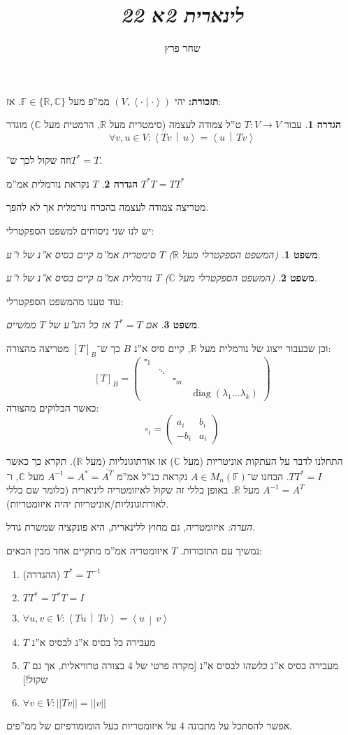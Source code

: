 \documentclass[]{article}
\author{שחר פרץ}
\title{\textit{לינארית 2א 22}}
\newcommand\R     {\mathbb{R}}
\newcommand\C     {\mathbb{C}}
\newcommand\ra    {\rangle}
\newcommand\la    {\langle}
\newcommand\ol    {\overline}
\DeclareMathOperator{\diag}    {diag}
\newcommand\F         {\mathbb{F}}
\newcommand\co        {\colon}
\newcommand\pms[1]    {\begin{pmatrix}
		#1
\end{pmatrix}}
\newcommand\norm[1]   {\left \vert \left \vert #1 \right \vert \right \vert}
\newcommand\smut      {\left \la \cdot \mid \cdot \right \ra}
\newcommand\mut[2]    {\left \la #1 \,\middle\vert\, #2 \right \ra}
\renewcommand\lg      {\lambda}
\newcommand\op    {^{-1}}
\newtheorem{Theorem}{משפט}
\theoremstyle{definition}
\newtheorem{definition}{הגדרה}
\newcommand\theo  [1] {\begin{Theorem}#1\end{Theorem}}
\newcommand\defi  [1] {\begin{definition}#1\end{definition}}
\begin{document}
	\maketitle
	\textbf{תזכורת: }יהי $(V, \smut)$ ממ''פ מעל $\F \in \{\R, \C\}$. אז: 
	\defi{עבור $T \co V \to V$ ט''ל צמודה לעצמה (סימטרית מעל $\R$, הרמטית מעל $\C$) מוגדר
	\[ \forall v, u \in V \co \mut{Tv}{u} = \mut{u}{Tv} \]}
	וזה שקול לכך ש־$T^* = T$. 
	\defi{$T$ נקראת נורמלית אמ''מ $T^*T = TT^*$}
	
	מטריצה צמודה לעצמה בהכרח נורמלית אך לא להפך. 
	
	יש לנו שני ניסוחים למשפט הספקטרלי: 
	
	\theo{(המשפט הספקטרלי מעל $\R$) $T$ סימטרית אמ''מ קיים בסיס א''נ של ו''ע. }
	\theo{(המשפט הספקטרלי מעל $\C$) $T$ נורמלית אמ''מ קיים בסיס א''נ של ו''ע. }
	
	\dotfill
	
	עוד טענו מהמשפט הספקטרלי: 
	
	\theo{אם $T^* = T$ אז כל הע''ע של $T$ ממשיים. }
	וכן שבעבור ייצוג של נורמלית מעל $\R$, קיים סיס א''נ $B$ כך ש־$[T]_B$ מטריצה מהצורה: 
	\[ [T]_B = \pms{\square_1 \\ & \ddots \\ &&\square_m \\ &&& \diag(\lg_1 \dots \lg_k)} \]
	כאשר הבלוקים מהצורה: 
	\[ \square_i = \pms{a_i & b_i \\ -b_i & a_i} \]
	
	\dotfill
	
	התחלנו לדבר על העתקות אוניטריות (מעל $\C$) או אורתוגונליות (מעל $\R$). תקרא כך כאשר $TT^* = I$. הבחנו ש־$A \in M_n(\F)$ נקראת כנ''ל אמ''מ $A\op = A^* = \ol{A^T}$ מעל $\C$, ו־$A\op = A^T$ מעל $\R$. באופן כללי זה שקול לאיזומטריה ליניארית (כלומר שם כללי לאורתוגונליות/אוניטריות יהיה איזומטריות). 
	
	\textit{הערה: }איזומטריה, גם מחוץ ללינארית, היא פונקציה שמשרת גודל. 
	
	נמשיך עם התזכורות. $T$ איזומטריה אמ''מ מתקיים אחד מבין הבאים: 
	\begin{enumerate}
		\item (ההגדרה) \hfil $T^* = T\op$
		\item \hfil $TT^* = T^*T = I$
		\item \hfil $\forall u, v \in V \co \mut{Tu}{Tv} = \mut{u}{v}$
		\item $T$ מעבירה כל בסיס א''נ לבסיס א''נ
		\item $T$ מעבירה בסיס א''נ \textit{כלשהו} לבסיס א''נ [מקרה פרטי של 4 בצורה טרוויאלית, אך גם שקול!]
		\item \hfil $\forall v \in V \co \norm{Tv} = \norm{v}$
	\end{enumerate}
	אפשר להסתכל על מתכונה 4 על איזומטריות כעל הומומורפיזם של ממ''פים. 
	
\end{document}
